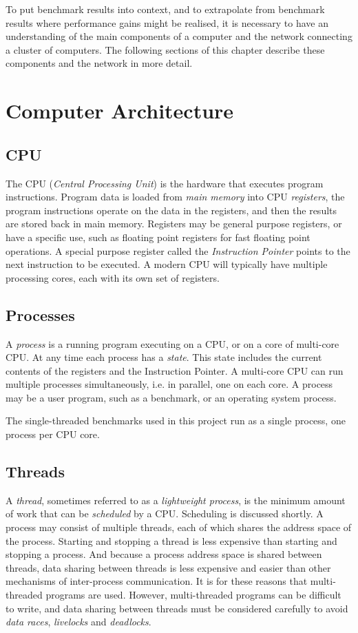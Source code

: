 To put benchmark results into context, and to extrapolate from benchmark results where performance gains might be realised, it is necessary to have an understanding of the main components of a computer and the network connecting a cluster of computers. The following sections of this chapter describe these components and the network in more detail.


%
%
\section{Computer Architecture}

\subsection{CPU}
The CPU (\emph{Central Processing Unit}) is the hardware that executes program instructions. Program data is loaded from \emph{main memory} into CPU \emph{registers}, the program instructions operate on the data in the registers, and then the results are stored back in main memory. Registers may be general purpose registers, or have a specific use, such as floating point registers for fast floating point operations. A special purpose register called the \emph{Instruction Pointer} points to the next instruction to be executed. A modern CPU will typically have multiple processing cores, each with its own set of registers.


\subsection{Processes}
A \emph{process} is a running program executing on a CPU, or on a core of multi-core CPU. At any time each process has a \emph{state}. This state includes the current contents of the registers and the Instruction Pointer. A multi-core CPU can run multiple processes simultaneously, i.e. in parallel, one on each core. A process may be a user program, such as a benchmark, or an operating system process.

The single-threaded benchmarks used in this project run as a single process, one process per CPU core.   


\subsection{Threads}
A \emph{thread}, sometimes referred to as a \emph{lightweight process}, is the minimum amount of work that can be \emph{scheduled} by a CPU. Scheduling is discussed shortly. A process may consist of multiple threads, each of which shares the address space of the process. Starting and stopping a thread is less expensive than starting and stopping a process. And because a process address space is shared between threads, data sharing between threads is less expensive and easier than other mechanisms of inter-process communication. It is for these reasons that multi-threaded programs are used. However, multi-threaded programs can be difficult to write, and data sharing between threads must be considered carefully to avoid \emph{data races}, \emph{livelocks} and \emph{deadlocks}.

